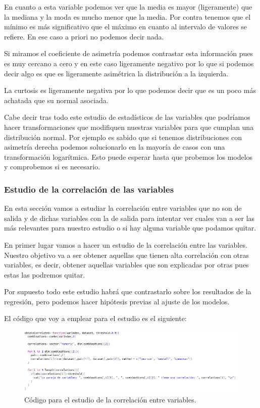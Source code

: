 \documentclass[12pt,a4paper]{article}
\begin{document}
En cuanto a esta variable podemos ver que la media es mayor (ligeramente) que la mediana y la moda es mucho menor que la media. Por contra tenemos que el mínimo es más significativo que el máximo en cuanto al intervalo de valores se refiere. En ese caso a priori no podemos decir nada.

Si miramos el coeficiente de asimetría podemos contrastar esta información pues es muy cercano a cero y en este caso ligeramente negativo por lo que si podemos decir algo es que es ligeramente asimétrica la distribución a la izquierda.

La curtosis es ligeramente negativa por lo que podemos decir que es un poco más achatada que su normal asociada.



Cabe decir tras todo este estudio de estadísticos de las variables que podríamos hacer transformaciones que modifiquen nuestras variables para que cumplan una distribución normal. Por ejemplo es sabido que si tenemos distribuciones con asimetría derecha podemos solucionarlo en la mayoría de casos con una transformación logarítmica. Esto puede esperar hasta que probemos los modelos y comprobemos si es necesario.

\subsubsection{Estudio de la correlación de las variables}

En esta sección vamos a estudiar la correlación entre variables que no son de salida y de dichas variables con la de salida para intentar ver cuales van a ser las más relevantes para nuestro estudio o si hay alguna variable que podamos quitar.

En primer lugar vamos a hacer un estudio de la correlación entre las variables. Nuestro objetivo va a ser obtener aquellas que tienen alta correlación con otras variables, es decir, obtener aquellas variables que son explicadas por otras pues estas las podremos quitar.

Por supuesto todo este estudio habrá que contrastarlo sobre los resultados de la regresión, pero podemos hacer hipótesis previas al ajuste de los modelos.

El código que voy a emplear para el estudio es el siguiente:

\begin{figure}[H]
	\centering
	\includegraphics[scale=0.51]{./Imagenes/EDA/Regresion/correlacion_entre_variables_codigo.png}
	\caption{Código para el estudio de la correlación entre variables.}
\end{figure}
\end{document}
